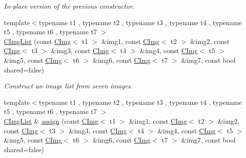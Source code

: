 \begin{DoxyCompactItemize}
\begin{DoxyCompactList}\small\item\em In-\/place version of the previous constructor. \item\end{DoxyCompactList}\item 
\hypertarget{structcimg__library_1_1_c_img_list_acf1e35998806708359175c773a3a587b}{
{\footnotesize template$<$typename t1 , typename t2 , typename t3 , typename t4 , typename t5 , typename t6 , typename t7 $>$ }\\\hyperlink{structcimg__library_1_1_c_img_list_acf1e35998806708359175c773a3a587b}{CImgList} (const \hyperlink{structcimg__library_1_1_c_img}{CImg}$<$ t1 $>$ \&img1, const \hyperlink{structcimg__library_1_1_c_img}{CImg}$<$ t2 $>$ \&img2, const \hyperlink{structcimg__library_1_1_c_img}{CImg}$<$ t3 $>$ \&img3, const \hyperlink{structcimg__library_1_1_c_img}{CImg}$<$ t4 $>$ \&img4, const \hyperlink{structcimg__library_1_1_c_img}{CImg}$<$ t5 $>$ \&img5, const \hyperlink{structcimg__library_1_1_c_img}{CImg}$<$ t6 $>$ \&img6, const \hyperlink{structcimg__library_1_1_c_img}{CImg}$<$ t7 $>$ \&img7, const bool shared=false)}
\label{structcimg__library_1_1_c_img_list_acf1e35998806708359175c773a3a587b}

\begin{DoxyCompactList}\small\item\em Construct an image list from seven images. \item\end{DoxyCompactList}\item 
\hypertarget{structcimg__library_1_1_c_img_list_a60e9d12ac9fc7c3059614c2d2243bdb8}{
{\footnotesize template$<$typename t1 , typename t2 , typename t3 , typename t4 , typename t5 , typename t6 , typename t7 $>$ }\\\hyperlink{structcimg__library_1_1_c_img_list}{CImgList} \& \hyperlink{structcimg__library_1_1_c_img_list_a60e9d12ac9fc7c3059614c2d2243bdb8}{assign} (const \hyperlink{structcimg__library_1_1_c_img}{CImg}$<$ t1 $>$ \&img1, const \hyperlink{structcimg__library_1_1_c_img}{CImg}$<$ t2 $>$ \&img2, const \hyperlink{structcimg__library_1_1_c_img}{CImg}$<$ t3 $>$ \&img3, const \hyperlink{structcimg__library_1_1_c_img}{CImg}$<$ t4 $>$ \&img4, const \hyperlink{structcimg__library_1_1_c_img}{CImg}$<$ t5 $>$ \&img5, const \hyperlink{structcimg__library_1_1_c_img}{CImg}$<$ t6 $>$ \&img6, const \hyperlink{structcimg__library_1_1_c_img}{CImg}$<$ t7 $>$ \&img7, const bool shared=false)}
\label{structcimg__library_1_1_c_img_list_a60e9d12ac9fc7c3059614c2d2243bdb8}


\end{DoxyCompactItemize}
